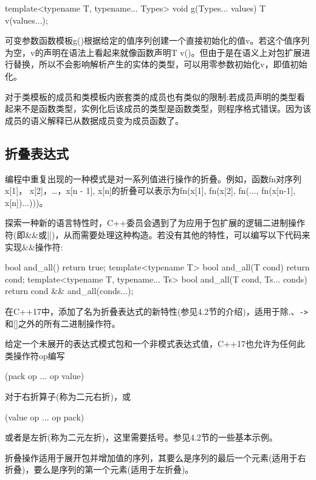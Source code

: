 \begin{cpp}
template<typename T, typename... Types>
void g(Types... values) {
	T v(values...);
}
\end{cpp}

可变参数函数模板g()根据给定的值序列创建一个直接初始化的值v。若这个值序列为空，v的声明在语法上看起来就像函数声明T v()。但由于是在语义上对包扩展进行替换，所以不会影响解析产生的实体的类型，可以用零参数初始化v，即值初始化。

\begin{notice}
对于类模板的成员和类模板内嵌套类的成员也有类似的限制:若成员声明的类型看起来不是函数类型，实例化后该成员的类型是函数类型，则程序格式错误。因为该成员的语义解释已从数据成员变为成员函数了。
\end{notice}

\subsection{折叠表达式}

编程中重复出现的一种模式是对一系列值进行操作的折叠。例如，函数fn对序列x[1]， x[2]，…，x[n - 1], x[n]的折叠可以表示为fn(x[1], fn(x[2], fn(..., fn(x[n-1], x[n])...)))。

探索一种新的语言特性时，C++委员会遇到了为应用于包扩展的逻辑二进制操作符(即\&\&或||)，从而需要处理这种构造。若没有其他的特性，可以编写以下代码来实现\&\&操作符:

\begin{cpp}
bool and_all() { return true; }
template<typename T>
	bool and_all(T cond) { return cond; }
template<typename T, typename... Ts>
	bool and_all(T cond, Ts... conds) {
		return cond && and_all(conds...);
	}
\end{cpp}

在C++17中，添加了名为折叠表达式的新特性(参见4.2节的介绍)，适用于除.、\texttt{->}和[]之外的所有二进制操作符。

给定一个未展开的表达式模式包和一个非模式表达式值，C++17也允许为任何此类操作符op编写

\begin{cpp}
(pack op ... op value)
\end{cpp}

对于右折算子(称为二元右折)，或

\begin{cpp}
(value op ... op pack)
\end{cpp}

或者是左折(称为二元左折)，这里需要括号。参见4.2节的一些基本示例。

折叠操作适用于展开包并增加值的序列，其要么是序列的最后一个元素(适用于右折叠)，要么是序列的第一个元素(适用于左折叠)。


